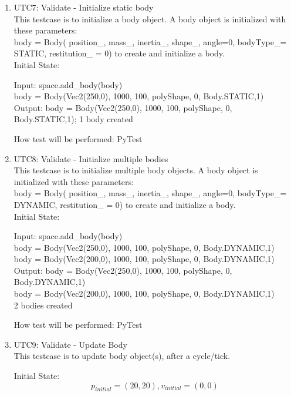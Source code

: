 \documentclass[12pt, titlepage]{article}
\begin{document}
\begin{enumerate}
\item{UTC7}{: Validate - Initialize static body\\} 
This testcase is to initialize a body object.
A body object is initialized with these parameters:\\ 
body = Body( position\_, mass\_, inertia\_, shape\_, angle=0, bodyType\_= STATIC, restitution\_ = 0) to create and initialize a body.\\

Initial State: 

Input: space.add\_body(body)\\
body = Body(Vec2(250,0), 1000, 100, polyShape, 0, Body.STATIC,1)\\

Output: body = Body(Vec2(250,0), 1000, 100, polyShape, 0, Body.STATIC,1); 1 body created

How test will be performed: PyTest\\

\item{UTC8}{: Validate - Initialize multiple bodies\\} 
This testcase is to initialize multiple body objects.
A body object is initialized with these parameters:\\ 
body = Body( position\_, mass\_, inertia\_, shape\_, angle=0, bodyType\_= DYNAMIC, restitution\_ = 0) to create and initialize a body.\\

Initial State: 

Input: space.add\_body(body)\\
body = Body(Vec2(250,0), 1000, 100, polyShape, 0, Body.DYNAMIC,1)\\
body = Body(Vec2(200,0), 1000, 100, polyShape, 0, Body.DYNAMIC,1)\\

Output: body = Body(Vec2(250,0), 1000, 100, polyShape, 0, Body.DYNAMIC,1)\\
        body = Body(Vec2(200,0), 1000, 100, polyShape, 0, Body.DYNAMIC,1)\\
        2 bodies created

How test will be performed: PyTest\\

\item{UTC9}{: Validate - Update Body\\}
This testcase is to update body object(s), after a cycle/tick.

Initial State: \[p_{initial} = (20,20), v_{initial} = (0, 0)\]
            

\end{enumerate}
\end{document}

